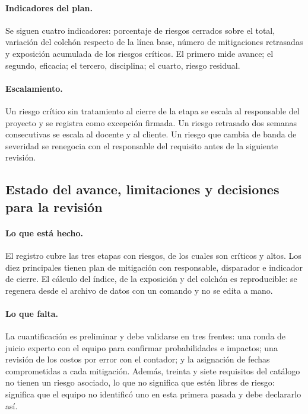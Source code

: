 \paragraph{Indicadores del plan.} Se siguen cuatro indicadores: porcentaje
de riesgos cerrados sobre el total, variación del colchón respecto de la
línea base, número de mitigaciones retrasadas y exposición acumulada de los
riesgos críticos. El primero mide avance; el segundo, eficacia; el tercero,
disciplina; el cuarto, riesgo residual.

\paragraph{Escalamiento.} Un riesgo crítico sin tratamiento al cierre de la
etapa se escala al responsable del proyecto y se registra como excepción
firmada. Un riesgo retrasado dos semanas consecutivas se escala al docente
y al cliente. Un riesgo que cambia de banda de severidad se renegocia con
el responsable del requisito antes de la siguiente revisión.

\subsection{Estado del avance, limitaciones y decisiones para la revisión}
\label{subsec:riesgos-estado}

\paragraph{Lo que está hecho.} El registro cubre las tres etapas con
\RiesgosTotal{} riesgos, de los cuales \RiesgosCriticos{} son críticos y
\RiesgosAltos{} altos. Los diez principales tienen plan de mitigación con
responsable, disparador e indicador de cierre. El cálculo del índice, de la
exposición y del colchón es reproducible: se regenera desde el archivo de
datos con un comando y no se edita a mano.

\paragraph{Lo que falta.} La cuantificación es preliminar y debe validarse
en tres frentes: una ronda de juicio experto con el equipo para confirmar
probabilidades e impactos; una revisión de los costos por error con el
contador; y la asignación de fechas comprometidas a cada mitigación. Además,
treinta y siete requisitos del catálogo no tienen un riesgo asociado, lo que
no significa que estén libres de riesgo: significa que el equipo no
identificó uno en esta primera pasada y debe declararlo así.

